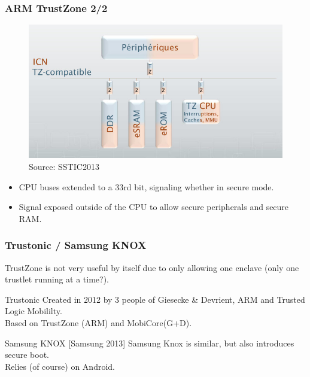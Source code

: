 \documentclass{beamer}
\begin{document}
\begin{frame}
    \frametitle{ARM TrustZone 2/2}

    \begin{figure}[htb]
        \centering
        \includegraphics[scale=.4]{assets/TrustZone-Hardware-Architecture2}
        \caption{Source: SSTIC2013}
    \end{figure}
    \vfill
    \begin{itemize}
        \item CPU buses extended to a 33rd bit, signaling whether in secure mode.
        \vfill
        \item Signal exposed outside of the CPU to allow secure peripherals and secure RAM.
    \end{itemize}
    \vfill

\end{frame}

\begin{frame}
    \frametitle{Trustonic / Samsung KNOX}

    TrustZone is not very useful by itself due to only allowing one enclave (only one trustlet running at a time?).
    \vfill
    \begin{block}{Trustonic}
        Created in 2012 by 3 people of Giesecke \& Devrient, ARM and Trusted Logic Mobililty.\\
        Based on TrustZone (ARM) and MobiCore(G+D).
    \end{block}
    \vfill
    \begin{block}{Samsung KNOX [Samsung 2013]}
        Samsung Knox is similar, but also introduces secure boot.\\
        Relies (of course) on Android.
    \end{block}
    \vfill
\end{frame}
\end{document}
